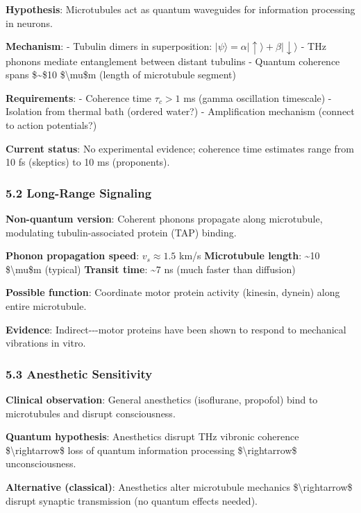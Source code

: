\textbf{Hypothesis}: Microtubules act as quantum waveguides for
information processing in neurons.

\textbf{Mechanism}: - Tubulin dimers in superposition:
\(|\psi\rangle = \alpha|\uparrow\rangle + \beta|\downarrow\rangle\) -
THz phonons mediate entanglement between distant tubulins - Quantum
coherence spans \$\sim\$10 \$\textbackslash mu\$m (length of microtubule
segment)

\textbf{Requirements}: - Coherence time \(\tau_c > 1\) ms (gamma
oscillation timescale) - Isolation from thermal bath (ordered water?) -
Amplification mechanism (connect to action potentials?)

\textbf{Current status}: No experimental evidence; coherence time
estimates range from 10 fs (skeptics) to 10 ms (proponents).

\subsubsection{5.2 Long-Range Signaling}\label{long-range-signaling}

\textbf{Non-quantum version}: Coherent phonons propagate along
microtubule, modulating tubulin-associated protein (TAP) binding.

\textbf{Phonon propagation speed}: \(v_s \approx 1.5\) km/s
\textbf{Microtubule length}: \textasciitilde10 \$\textbackslash mu\$m
(typical) \textbf{Transit time}: \textasciitilde7 ns (much faster than
diffusion)

\textbf{Possible function}: Coordinate motor protein activity (kinesin,
dynein) along entire microtubule.

\textbf{Evidence}: Indirect-\/-\/-motor proteins have been shown to
respond to mechanical vibrations in vitro.

\subsubsection{5.3 Anesthetic Sensitivity}\label{anesthetic-sensitivity}

\textbf{Clinical observation}: General anesthetics (isoflurane,
propofol) bind to microtubules and disrupt consciousness.

\textbf{Quantum hypothesis}: Anesthetics disrupt THz vibronic coherence
\$\textbackslash rightarrow\$ loss of quantum information processing
\$\textbackslash rightarrow\$ unconsciousness.

\textbf{Alternative (classical)}: Anesthetics alter microtubule
mechanics \$\textbackslash rightarrow\$ disrupt synaptic transmission
(no quantum effects needed).

